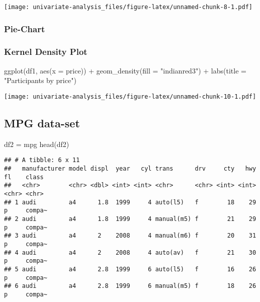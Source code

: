 \documentclass[
]{article}
\newenvironment{Shaded}{\begin{snugshade}}{\end{snugshade}}
\newcommand{\AttributeTok}[1]{\textcolor[rgb]{0.77,0.63,0.00}{#1}}
\newcommand{\FunctionTok}[1]{\textcolor[rgb]{0.00,0.00,0.00}{#1}}
\newcommand{\NormalTok}[1]{#1}
\newcommand{\OtherTok}[1]{\textcolor[rgb]{0.56,0.35,0.01}{#1}}
\newcommand{\SpecialCharTok}[1]{\textcolor[rgb]{0.00,0.00,0.00}{#1}}
\newcommand{\StringTok}[1]{\textcolor[rgb]{0.31,0.60,0.02}{#1}}
\begin{document}
\texttt{[image: univariate-analysis\_files/figure-latex/unnamed-chunk-8-1.pdf]}

\hypertarget{pie-chart}{%
\subsubsection{Pie-Chart}\label{pie-chart}}

\hypertarget{kernel-density-plot}{%
\subsubsection{Kernel Density Plot}\label{kernel-density-plot}}

\begin{Shaded}
\begin{Highlighting}[]
\FunctionTok{ggplot}\NormalTok{(df1, }\FunctionTok{aes}\NormalTok{(}\AttributeTok{x =}\NormalTok{ price)) }\SpecialCharTok{+}
       \FunctionTok{geom\_density}\NormalTok{(}\AttributeTok{fill =} \StringTok{"indianred3"}\NormalTok{) }\SpecialCharTok{+} 
       \FunctionTok{labs}\NormalTok{(}\AttributeTok{title =} \StringTok{"Participants by price"}\NormalTok{)}
\end{Highlighting}
\end{Shaded}

\texttt{[image: univariate-analysis\_files/figure-latex/unnamed-chunk-10-1.pdf]}

\hypertarget{mpg-data-set}{%
\subsection{MPG data-set}\label{mpg-data-set}}

\begin{Shaded}
\begin{Highlighting}[]
\NormalTok{df2 }\OtherTok{=}\NormalTok{ mpg}
\FunctionTok{head}\NormalTok{(df2)}
\end{Highlighting}
\end{Shaded}

\begin{verbatim}
## # A tibble: 6 x 11
##   manufacturer model displ  year   cyl trans      drv     cty   hwy fl    class 
##   <chr>        <chr> <dbl> <int> <int> <chr>      <chr> <int> <int> <chr> <chr> 
## 1 audi         a4      1.8  1999     4 auto(l5)   f        18    29 p     compa~
## 2 audi         a4      1.8  1999     4 manual(m5) f        21    29 p     compa~
## 3 audi         a4      2    2008     4 manual(m6) f        20    31 p     compa~
## 4 audi         a4      2    2008     4 auto(av)   f        21    30 p     compa~
## 5 audi         a4      2.8  1999     6 auto(l5)   f        16    26 p     compa~
## 6 audi         a4      2.8  1999     6 manual(m5) f        18    26 p     compa~
\end{verbatim}
\end{document}

